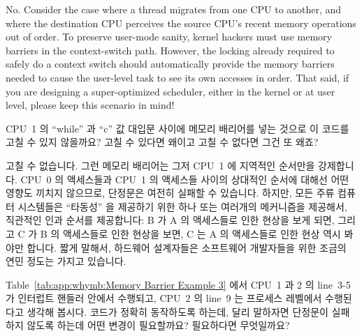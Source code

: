 \begin{enumerate}
	No.  Consider the case where a thread migrates from one CPU to
	another, and where the destination CPU perceives the source
	CPU's recent memory operations out of order.  To preserve
	user-mode sanity, kernel hackers must use memory barriers in
	the context-switch path.  However, the locking already required
	to safely do a context switch should automatically provide
	the memory barriers needed to cause the user-level task to see
	its own accesses in order.  That said, if you are designing a
	super-optimized scheduler, either in the kernel or at user level,
	please keep this scenario in mind!
	\fi

\QuickQ{}
	CPU~1 의 ``while'' 과 ``c'' 값 대입문 사이에 메모리 배리어를 넣는
	것으로 이 코드를 고칠 수 있지 않을까요?
	고칠 수 있다면 왜이고 고칠 수 없다면 그건 또 왜죠?

\QuickA{}
	고칠 수 없습니다.
	그런 메모리 배리어는 그저 CPU~1 에 지역적인 순서만을 강제합니다.
	CPU~0 의 액세스들과 CPU~1 의 액세스들 사이의 상대적인 순서에 대해선
	어떤 영향도 끼치지 않으므로, 단정문은 여전히 실패할 수 있습니다.
	하지만, 모든 주류 컴퓨터 시스템들은 ``타동성'' 을 제공하기 위한 하나
	또는 여러개의 메커니즘을 제공해서, 직관적인 인과 순서를 제공합니다: B
	가 A 의 액세스들로 인한 현상을 보게 되면, 그리고 C 가 B 의 액세스들로
	인한 현상을 보면, C 는 A 의 액세스들로 인한 현상 역시 봐야만 합니다.
	짧게 말해서, 하드웨어 설계자들은 소프트웨어 개발자들을 위한 조금의 연민
	정도는 가지고 있습니다.

\QuickQ{}
	Table~\ref{tab:app:whymb:Memory Barrier Example 3} 에서 CPU~1 과 2 의
	line~3-5 가 인터럽트 핸들러 안에서 수행되고, CPU~2 의 line~9 는
	프로세스 레벨에서 수행된다고 생각해 봅시다.
	코드가 정확히 동작하도록 하는데, 달리 말하자면 단정문이 실패하지 않도록
	하는데 어떤 변경이 필요할까요? 필요하다면 무엇일까요?
	\iffalse


\end{enumerate}
